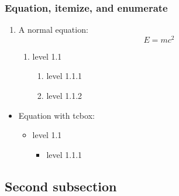 \documentclass[11pt]{beamer}
\begin{document}
\begin{frame}[t, label=equations]
\frametitle{Equation, itemize, and enumerate}

    \begin{enumerate}
        \item A normal equation:
        \begin{equation}
            E = mc^2
        \end{equation}
        \begin{enumerate}
            \item level 1.1
            \begin{enumerate}
                \item level 1.1.1
                \item level 1.1.2
            \end{enumerate}
        \end{enumerate}
    \end{enumerate}
    
    \begin{itemize}
        \item Equation with tcbox:
        \begin{center}
        \end{center}
        \begin{itemize}
            \item level 1.1
            \begin{itemize}
                \item level 1.1.1
            \end{itemize}
        \end{itemize}
    \end{itemize}
\end{frame}

\subsection{Second subsection}
\end{document}
